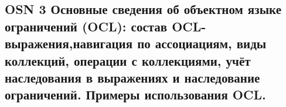 \subsection{OSN 3 Основные сведения об объектном языке ограничений (OCL): состав OCL-выражения,навигация по ассоциациям, виды коллекций, операции с коллекциями, учёт наследования в выражениях и наследование ограничений. Примеры использования OCL.}
